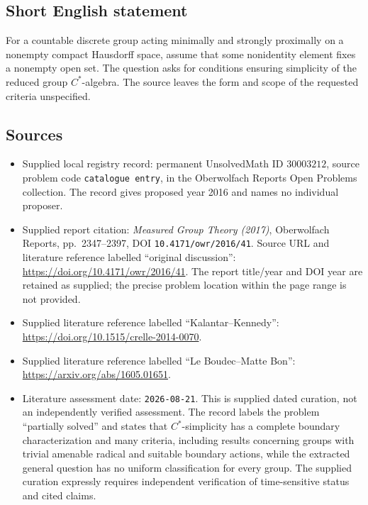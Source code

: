 \documentclass[11pt]{article}
\begin{document}
\subsection{Short English statement}
For a countable discrete group acting minimally and strongly proximally on a nonempty compact Hausdorff space, assume that some nonidentity element fixes a nonempty open set. The question asks for conditions ensuring simplicity of the reduced group \(C^*\)-algebra. The source leaves the form and scope of the requested criteria unspecified.
\subsection{Sources}
\begin{itemize}
\item Supplied local registry record: permanent UnsolvedMath ID \(30003212\), source problem code \texttt{catalogue entry}, in the Oberwolfach Reports Open Problems collection. The record gives proposed year 2016 and names no individual proposer.
\item Supplied report citation: \emph{Measured Group Theory (2017)}, Oberwolfach Reports, pp.\ 2347--2397, DOI \texttt{10.4171/owr/2016/41}. Source URL and literature reference labelled ``original discussion'': \url{https://doi.org/10.4171/owr/2016/41}. The report title/year and DOI year are retained as supplied; the precise problem location within the page range is not provided.
\item Supplied literature reference labelled ``Kalantar--Kennedy'': \url{https://doi.org/10.1515/crelle-2014-0070}.
\item Supplied literature reference labelled ``Le Boudec--Matte Bon'': \url{https://arxiv.org/abs/1605.01651}.
\item Literature assessment date: \texttt{2026-08-21}. This is supplied dated curation, not an independently verified assessment. The record labels the problem ``partially solved'' and states that \(C^*\)-simplicity has a complete boundary characterization and many criteria, including results concerning groups with trivial amenable radical and suitable boundary actions, while the extracted general question has no uniform classification for every group. The supplied curation expressly requires independent verification of time-sensitive status and cited claims.
\end{itemize}
\end{document}

